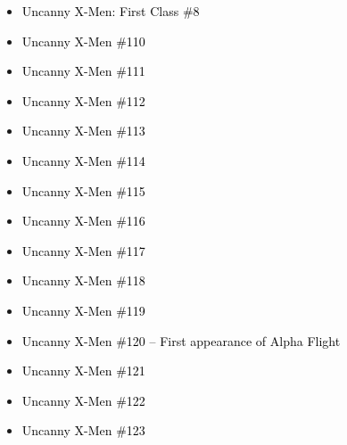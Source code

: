 \documentclass[12pt]{article}
\newcommand{\checkbox}{\raisebox{0.0ex}{\fbox{\rule{0ex}{1.5ex} \rule{1.5ex}{0ex}}}}
\begin{document}
\vspace{0.3cm}
\noindent
\begin{tcolorbox}[
  colback=white!95!gray,
  colframe=black,
  width=\textwidth,
  arc=4mm,
  auto outer arc,
  boxrule=0.8pt,
  left=8pt,right=8pt,top=8pt,bottom=8pt
]
\begin{itemize}[left=0pt,label={\checkbox}]
  \item \textcolor{black}{Uncanny X-Men: First Class \#8}
  \item \textcolor{black}{Uncanny X-Men \#110}
  \item \textcolor{black}{Uncanny X-Men \#111}
  \item \textcolor{black}{Uncanny X-Men \#112}
  \item \textcolor{black}{Uncanny X-Men \#113}
  \item \textcolor{black}{Uncanny X-Men \#114}
  \item \textcolor{black}{Uncanny X-Men \#115}
  \item \textcolor{black}{Uncanny X-Men \#116}
  \item \textcolor{black}{Uncanny X-Men \#117}
  \item \textcolor{black}{Uncanny X-Men \#118}
  \item \textcolor{black}{Uncanny X-Men \#119}
  \item \textcolor{black}{Uncanny X-Men \#120 – First appearance of Alpha Flight}
  \item \textcolor{black}{Uncanny X-Men \#121}
  \item \textcolor{black}{Uncanny X-Men \#122}
  \item \textcolor{black}{Uncanny X-Men \#123}
\end{itemize}
\end{tcolorbox}

\newpage
{}
\end{document}
